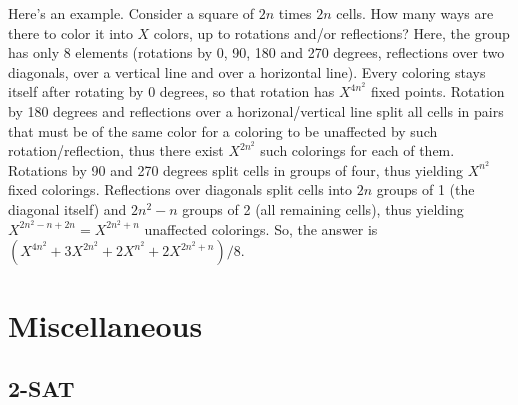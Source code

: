 \documentclass[12pt]{extarticle}
\begin{document}
\begin{multicols*}{2}
Here's an example. Consider a square of $2n$ times $2n$ cells. How many ways
are there to color it into $X$ colors, up to rotations and/or reflections?
Here, the group has only 8 elements (rotations by 0, 90, 180 and 270 degrees,
reflections over two diagonals, over a vertical line and over a horizontal
line). Every coloring stays itself after rotating by 0 degrees, so that
rotation has $X^{4n^2}$ fixed points. Rotation by 180 degrees and reflections
over a horizonal/vertical line split all cells in pairs that must be of the
same color for a coloring to be unaffected by such rotation/reflection, thus
there exist $X^{2n^2}$ such colorings for each of them. Rotations by 90 and 270
degrees split cells in groups of four, thus yielding $X^{n^2}$ fixed colorings.
Reflections over diagonals split cells into $2n$ groups of 1 (the diagonal
itself) and $2n^2-n$ groups of 2 (all remaining cells), thus yielding
$X^{2n^2-n+2n}=X^{2n^2+n}$ unaffected colorings.  So, the answer is
$(X^{4n^2}+3X^{2n^2}+2X^{n^2}+2X^{2n^2+n})/8$.

\section{Miscellaneous}
\subsection{2-SAT} %


% 






% 


\end{multicols*}
\end{document}
